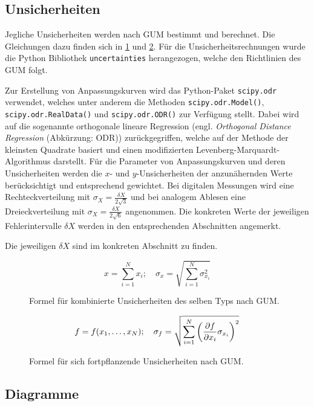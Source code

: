\subsection{Unsicherheiten}\label{VGuD}

Jegliche Unsicherheiten werden nach GUM bestimmt und berechnet.
Die Gleichungen dazu finden sich in \cref{fig:GUM_combine} und \cref{fig:GUM_formula}.
Für die Unsicherheitsrechnungen wurde die Python Bibliothek \texttt{uncertainties} herangezogen, welche den Richtlinien des GUM folgt.

Zur Erstellung von Anpassungskurven wird das Python-Paket \texttt{scipy.odr} verwendet, welches unter anderem die Methoden \texttt{scipy.odr.Model()}, \texttt{scipy.odr.RealData()} und \texttt{scipy.odr.ODR()} zur Verfügung stellt.
Dabei wird auf die sogenannte orthogonale lineare Regression (engl. \emph{Orthogonal Distance Regression} (Abkürzung: ODR)) zurückgegriffen, welche auf der Methode der kleinsten Quadrate basiert und einen modifizierten Levenberg-Marquardt-Algorithmus darstellt.
Für die Parameter von Anpassungskurven und deren Unsicherheiten werden die $x$- und $y$-Unsicherheiten der anzunähernden Werte berücksichtigt und entsprechend gewichtet.
Bei digitalen Messungen wird eine Rechteckverteilung mit $\sigma_X = \frac{\delta X}{2\sqrt{3}}$ und bei analogem Ablesen eine Dreieckverteilung mit $\sigma_X = \frac{\delta X}{2\sqrt{6}}$ angenommen.
Die konkreten Werte der jeweiligen Fehlerintervalle $\delta X$ werden in den entsprechenden Abschnitten angemerkt.

Die jeweiligen $\delta X$ sind im konkreten Abschnitt zu finden.
\begin{figure}[ht]
	\begin{equation*}
		x = \sum_{i=1}^{N} x_i
		;\quad
		\sigma_x = \sqrt{\sum_{i = 1}^{N} \sigma_{x_i}^2}
	\end{equation*}
	\caption{Formel für kombinierte Unsicherheiten des selben Typs nach GUM.}
	\label{fig:GUM_combine}
\end{figure}

\begin{figure}[ht]
	\begin{align*}
		f = f(x_1, \dots , x_N)
		;\quad
		\sigma_f = \sqrt{\sum_{i = 1}^{N}\left(\pdv{f}{x_i} \sigma_{x_i}\right) ^2}
	\end{align*}
	\caption{Formel für sich fortpflanzende Unsicherheiten nach GUM.}
	\label{fig:GUM_formula}
\end{figure}

\subsection{Diagramme}

